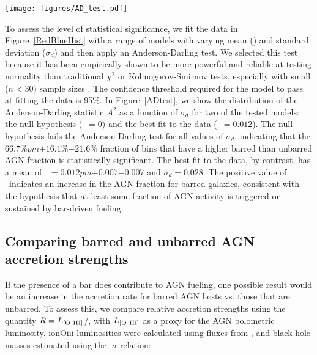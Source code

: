 \begin{figure*}
\centering
\texttt{[image: figures/AD\_test.pdf]}
\caption{Fits of the binned fraction of barred vs. unbarred AGN fractions to a normal distribution. \textit{Left:} value of the Anderson-Darling test ($A^2$) as a function of the standard deviation of the normal distribution being fit ($\sigma_d$). The horizontal black line shows the critical value of $A^2$ corresponding to 95\%; a model must fall below this line to be considered an acceptable fit at this level of confidence. Two models are shown: the null hypothesis (blue diamonds) and the best fit to the data in Figure~\ref{RedBlueHist} (purple triangles). \textit{Right}: Plot of the minimum $A^2$ for the full range of means (\db) tested for the data. This shows that acceptable fits can be found for $0.005<$\db$<0.019$, but that the null hypothesis is ruled out at 95\% confidence.}
\label{ADtest}
\end{figure*}

To assess the level of statistical significance, we fit the data in Figure~\ref{RedBlueHist} with a range of models with varying mean (\db) and standard deviation ($\sigma_d$) and then apply an Anderson-Darling test. We selected this test because it has been empirically shown to be more powerful and reliable at testing normality than traditional $\chi^2$ or Kolmogorov-Smirnov tests, especially with small ($n<30$) sample sizes \citep{Hou2009}. The confidence threshold required for the model to pass at fitting the data is 95\%. In Figure~\ref{ADtest}, we show the distribution of the Anderson-Darling statistic $A^2$ as a function of $\sigma_d$ for two  of the tested models: the null hypothesis (\db~$=0$) and the best fit to the data (\db~$=0.012$). The null hypothesis fails the Anderson-Darling test for all values of $\sigma_d$, indicating that the $66.7\%pm{+16.1\%}{-21.6\%}$ fraction of bins that have a higher barred than unbarred AGN fraction is statistically significant. The best fit to the data, by contrast, has a mean of \db~$=0.012 pm {+0.007}{-0.007}$ and $\sigma_d=0.028$. The positive value of \db~indicates an increase in the AGN fraction for \underline{barred galaxies}, consistent with the hypothesis that at least some fraction of AGN activity is triggered or sustained by bar-driven fueling.



\subsection{Comparing barred and unbarred AGN accretion strengths}
\label{sec:Eddington Ratio}
If the presence of a bar does contribute to AGN fueling, one possible result would be an increase in the accretion rate for barred AGN hosts vs. those that are unbarred. To assess this, we compare relative accretion strengths using the quantity $R=L_{\rm{[O~III]}}$/\mbh, with $L_{\rm{[O~III]}}$ as a proxy for the AGN bolometric luminosity. ion{O}{iii} luminosities were calculated using fluxes from \citet{Oh2011}, and black hole masses estimated using the \mbh-$\sigma$ relation:

